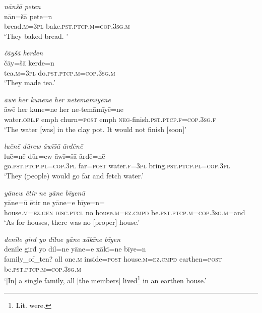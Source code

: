 \ea \label{ŽE.19}
\textit{nānšā peten} \\ 
\gll nān=šā pete=n \\ 
 bread\textsc{.m}\textsc{=3pl} bake\textsc{.pst}\textsc{.ptcp}\textsc{.m}\textsc{=cop}\textsc{.3sg}\textsc{.m} \\ 
\glt `They baked bread. '
\z 
 
\ea \label{ŽE.20}
\textit{čāyšā kerden} \\ 
\gll čāy=šā kerde=n \\ 
 tea\textsc{.m}\textsc{=3pl} do\textsc{.pst}\textsc{.ptcp}\textsc{.m}\textsc{=cop}\textsc{.3sg}\textsc{.m} \\ 
\glt `They made tea.'
\z 
 
\ea \label{ŽE.21}
\textit{āwē her kunene her netemāmīyēne} \\ 
\gll āwē her kune=ne her ne-temāmīyē=ne \\ 
 water\textsc{.obl}\textsc{.f} emph churn\textsc{=\textsc{post}} emph \textsc{neg-}finish\textsc{.pst}\textsc{.ptcp}\textsc{.f}\textsc{=cop}\textsc{.3sg}\textsc{.f} \\ 
\glt `The water [was] in the clay pot. It would not finish [soon]'
\z 
 
\ea \label{ŽE.24}
\textit{luēnē dūrew āwīšā ārdēnē} \\ 
\gll luē=nē dūr=ew āwī=šā ārdē=nē \\ 
 go\textsc{.pst}\textsc{.ptcp}\textsc{.pl}\textsc{=cop}\textsc{.3pl} far\textsc{=\textsc{post}} water\textsc{.f}\textsc{=3pl} bring\textsc{.pst}\textsc{.ptcp}\textsc{.pl}\textsc{=cop}\textsc{.3pl} \\ 
\glt `They (people) would go far and fetch water.'
\z 
 
\ea \label{ŽE.25}
\textit{yānew ētir ne yāne bīyenū} \\ 
\gll yāne=ū ētir ne yāne=e bīye=n=\\ 
 house\textsc{.m}\textsc{\textsc{=ez.gen}} \textsc{disc.ptcl} no house\textsc{.m}\textsc{=ez}\textsc{.cmpd} be\textsc{.pst}\textsc{.ptcp}\textsc{.m}\textsc{=cop}\textsc{.3sg}\textsc{.m}=and \\ 
\glt `As for houses, there was no [proper] house.'
\z 
 
\ea \label{ŽE.26}
\textit{denīle girđ yo dilne yāne xākīne bīyen} \\ 
\gll denīle girđ yo dil=ne yāne=e xākī=ne bīye=n \\ 
 family\_of\_ten? all one\textsc{.m} inside\textsc{=\textsc{post}} house\textsc{.m}\textsc{=ez}\textsc{.cmpd} earthen\textsc{=\textsc{post}} be\textsc{.pst}\textsc{.ptcp}\textsc{.m}\textsc{=cop}\textsc{.3sg}\textsc{.m} \\ 
\glt `[In] a single family, all [the members] lived\footnote{Lit. were.} in an earthen house.'
\z 
 
